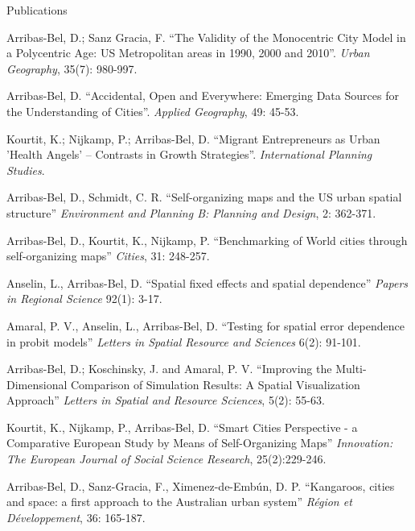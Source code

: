 \documentclass[12pt,2up]{article}
\begin{document}
\begin{cv}{}
\begin{cvlist}{Publications}
\item[2014] Arribas-Bel, D.; Sanz Gracia, F. ``The Validity of the Monocentric
    City Model in a Polycentric Age: US Metropolitan areas in 1990, 2000 and 2010''.
    \emph{Urban Geography}, 35(7): 980-997.

\item[] Arribas-Bel, D. ``Accidental, Open and Everywhere: Emerging Data Sources
    for the Understanding of Cities''. \emph{Applied Geography}, 49: 45-53.

\item[] Kourtit, K.; Nijkamp, P.; Arribas-Bel, D. ``Migrant
    Entrepreneurs as Urban 'Health Angels' -- Contrasts in Growth Strategies''.
    \emph{International Planning Studies}.

\item[2013] Arribas-Bel, D., Schmidt, C. R.
    ``Self-organizing maps and the US urban spatial structure''
    \emph{Environment and Planning B: Planning and Design}, 2: 362-371.

\item[] Arribas-Bel, D., Kourtit, K.,
    Nijkamp, P. ``Benchmarking of World cities through self-organizing maps''
    \emph{Cities}, 31: 248-257.

\item[] Anselin, L., Arribas-Bel, D.
    ``Spatial fixed effects and spatial dependence''
    \emph{Papers in Regional Science} 92(1): 3-17.

\item[] Amaral, P. V.,  Anselin, L., Arribas-Bel, D.
    ``Testing for spatial error dependence in probit models''
    \emph{Letters in Spatial Resource and Sciences} 6(2): 91-101.

\item[2012] Arribas-Bel, D.; Koschinsky, J. and Amaral, P. V. ``Improving the
    Multi-Dimensional Comparison of Simulation Results: A Spatial
    Visualization Approach'' \emph{Letters in Spatial and Resource Sciences},
    5(2): 55-63.

\item[] Kourtit, K.,
    Nijkamp, P., Arribas-Bel, D. ``Smart Cities Perspective - a Comparative
    European Study by Means of Self-Organizing Maps''
    \emph{Innovation: The European Journal of Social Science Research},
    25(2):229-246.

\item[] Arribas-Bel, D., Sanz-Gracia, F.,
    Ximenez-de-Emb\'{u}n, D. P. ``Kangaroos, cities and space: a first
    approach to the Australian urban system''
    \emph{R\'{e}gion et D\'{e}veloppement}, 36: 165-187.


\end{cvlist}
\end{cv}
\end{document}
